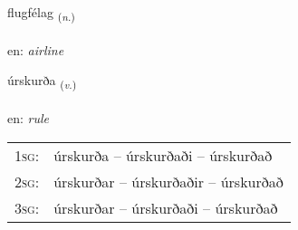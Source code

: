 \documentclass[frontgrid, backgrid]{flacards}\usepackage[]{graphicx}\usepackage[]{xcolor}
\begin{document}
\renewcommand{\flhead}{\vskip5pt \fboxsep=0pt {\small\bfseries\footnotesize Nafnorð | Noun}}
\renewcommand{\fcfoot}{\vskip5pt \fboxsep=0pt \hspace{2pt}{\small\bfseries\footnotesize 3K}}

\renewcommand{\blhead}{\vskip5pt {\small\bfseries\footnotesize Nafnorð | Noun }}
\renewcommand{\bcfoot}{\vskip5pt \hspace{2pt}{\small\bfseries\footnotesize 3K}}


{flugfélag \small{\textsubscript{(\textit{n.})}} \\[1ex] %
\textphonetic{[flʏxfjɛlaɣ]} \\
en: \emph{airline} \\  [2ex]
\renewcommand*{\arraystretch}{0.8}
}

\renewcommand{\flhead}{\vskip5pt \fboxsep=0pt {\small\bfseries\footnotesize Sagnorð | Verb}}
\renewcommand{\fcfoot}{\vskip5pt \fboxsep=0pt \hspace{2pt}{\small\bfseries\footnotesize 3K}}

\renewcommand{\blhead}{\vskip5pt {\small\bfseries\footnotesize Sagnorð | Verb }}
\renewcommand{\bcfoot}{\vskip5pt \hspace{2pt}{\small\bfseries\footnotesize 3K}}


{úrskurða \small{\textsubscript{(\textit{v.})}} \\[1ex] %
\textphonetic{[ur̥skʏrða]} \\
en: \emph{rule} \\  [2ex]
\renewcommand*{\arraystretch}{0.8}
\begin{tabular}{p{1cm}l}
\textsc{1sg}: & úrskurða -- úrskurðaði -- úrskurðað \\ 
\textsc{2sg}: & úrskurðar -- úrskurðaðir -- úrskurðað \\ 
\textsc{3sg}: & úrskurðar -- úrskurðaði -- úrskurðað \\ 
\end{tabular}
}
\end{document}
